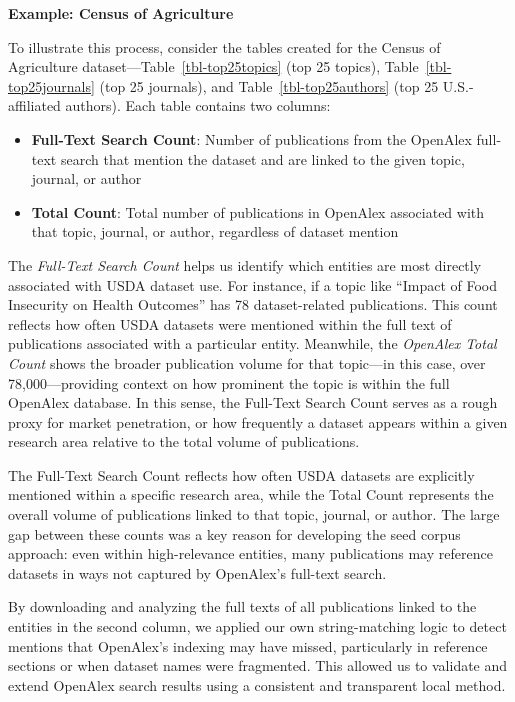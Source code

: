 \documentclass[
  letterpaper,
  DIV=11,
  numbers=noendperiod]{scrartcl}
\providecommand{\tightlist}{%
  \setlength{\itemsep}{0pt}\setlength{\parskip}{0pt}}\usepackage{longtable,booktabs,array}
\begin{document}
\textbf{Example: Census of Agriculture}

To illustrate this process, consider the tables created for the Census
of Agriculture dataset---Table~\ref{tbl-top25topics} (top 25 topics),
Table~\ref{tbl-top25journals} (top 25 journals), and
Table~\ref{tbl-top25authors} (top 25 U.S.-affiliated authors). Each
table contains two columns:

\begin{itemize}
\tightlist
\item
  \textbf{Full-Text Search Count}: Number of publications from the
  OpenAlex full-text search that mention the dataset and are linked to
  the given topic, journal, or author
\item
  \textbf{Total Count}: Total number of publications in OpenAlex
  associated with that topic, journal, or author, regardless of dataset
  mention
\end{itemize}

The \emph{Full-Text Search Count} helps us identify which entities are
most directly associated with USDA dataset use. For instance, if a topic
like ``Impact of Food Insecurity on Health Outcomes'' has 78
dataset-related publications. This count reflects how often USDA
datasets were mentioned within the full text of publications associated
with a particular entity. Meanwhile, the \emph{OpenAlex Total Count}
shows the broader publication volume for that topic---in this case, over
78,000---providing context on how prominent the topic is within the full
OpenAlex database. In this sense, the Full-Text Search Count serves as a
rough proxy for market penetration, or how frequently a dataset appears
within a given research area relative to the total volume of
publications.

The Full-Text Search Count reflects how often USDA datasets are
explicitly mentioned within a specific research area, while the Total
Count represents the overall volume of publications linked to that
topic, journal, or author. The large gap between these counts was a key
reason for developing the seed corpus approach: even within
high-relevance entities, many publications may reference datasets in
ways not captured by OpenAlex's full-text search.

By downloading and analyzing the full texts of all publications linked
to the entities in the second column, we applied our own string-matching
logic to detect mentions that OpenAlex's indexing may have missed,
particularly in reference sections or when dataset names were
fragmented. This allowed us to validate and extend OpenAlex search
results using a consistent and transparent local method.
\end{document}
